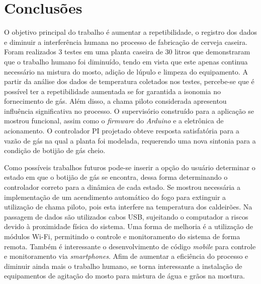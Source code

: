 	\chapter{Conclusões}
O objetivo principal do trabalho é aumentar a repetibilidade, o registro dos dados e diminuir a interferência humana no processo de fabricação de cerveja caseira. Foram realizados 3 testes em uma planta caseira de 30 litros que demonstraram que o trabalho humano foi diminuído, tendo em vista que este apenas continua necessário na mistura do mosto, adição de lúpulo e limpeza do equipamento.  A partir da análise dos dados de temperatura coletados nos testes,  percebe-se que é possível ter a repetibilidade aumentada se for garantida a isonomia no fornecimento de gás. Além disso, a chama piloto considerada apresentou influência significativa no processo. O supervisório construído para a aplicação se mostrou funcional, assim como o \textit{firmware} do \textit{Arduino} e a eletrônica de acionamento. O controlador PI projetado obteve resposta satisfatória para a vazão de gás na qual a planta foi modelada, requerendo uma nova sintonia para a condição de botijão de gás cheio.

Como possíveis trabalhos futuros pode-se inserir a opção do usuário determinar o estado em que o botijão de gás se encontra, dessa forma determinando o controlador correto para a dinâmica de cada estado. Se mostrou necessária a implementação de um acendimento automático do fogo para extinguir a utilização de chama piloto, pois esta interfere na temperatura dos caldeirões. Na passagem de dados são utilizados cabos USB, sujeitando o computador a riscos devido à proximidade física do sistema. Uma forma de melhoria é a utilização de módulos Wi-Fi, permitindo o controle e monitoramento do sistema de forma remota. Também é interessante o desenvolvimento de código \textit{mobile} para controle e monitoramento via \textit{smartphones}. Afim de aumentar a eficiência do processo e diminuir ainda mais o trabalho humano, se torna interessante a instalação de equipamentos de agitação do mosto para mistura de água e grãos na mostura. 

 

	\postextual
	

